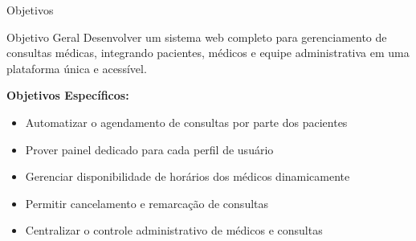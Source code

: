 \documentclass[xcolor={table}]{beamer}
\begin{document}
\begin{frame}{Objetivos}
    \begin{block}{Objetivo Geral}
        \justifying
        Desenvolver um sistema web completo para gerenciamento de consultas médicas,
        integrando pacientes, médicos e equipe administrativa em uma plataforma única e
        acessível.
    \end{block}
    \vspace{0.3cm}
    \textbf{Objetivos Específicos:}
    \begin{itemize}
        \item[\color{ClinicBlue}$\checkmark$] Automatizar o agendamento de consultas por parte dos pacientes
        \item[\color{ClinicBlue}$\checkmark$] Prover painel dedicado para cada perfil de usuário
        \item[\color{ClinicBlue}$\checkmark$] Gerenciar disponibilidade de horários dos médicos dinamicamente
        \item[\color{ClinicBlue}$\checkmark$] Permitir cancelamento e remarcação de consultas
        \item[\color{ClinicBlue}$\checkmark$] Centralizar o controle administrativo de médicos e consultas
    \end{itemize}
\end{frame}
\end{document}
